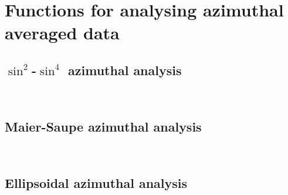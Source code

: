 \clearpage
\section{Functions for analysing azimuthal averaged data}



\subsection{$\sin^2$-$\sin^4$ azimuthal analysis} ~\\
\subsection{Maier-Saupe azimuthal analysis} ~\\
\subsection{Ellipsoidal azimuthal analysis} ~\\ \cite{Summerfield1983,Mildner1983,Reynolds1984,Hammouda1986,Hammouda1986a,Saraf1989,Svetogorsky1990,Gu2016,Gu2018} 